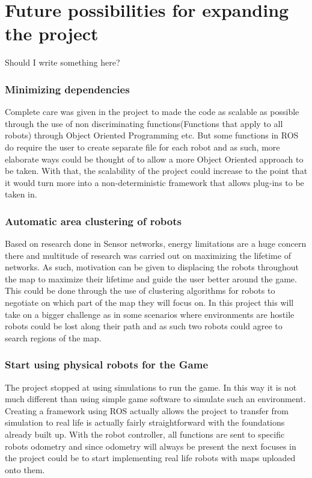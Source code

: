 \documentclass{report}
\begin{document}
    \section{Future possibilities for expanding the project}
      Should I write something here?

      \subsubsection{Minimizing dependencies}
        Complete care was given in the project to made the code as scalable as possible through the use of non discriminating functions(Functions that apply to all robots) through Object Oriented Programming etc. But some functions in ROS do require the user to create separate file for each robot and as such, more elaborate ways could be thought of to allow a more Object Oriented approach to be taken. With that, the scalability of the project could increase to the point that it would turn more into a non-deterministic framework that allows plug-ins to be taken in.

      \subsubsection{Automatic area clustering of robots}
        Based on research done in Sensor networks, energy limitations are a huge concern there and multitude of research was carried out on maximizing the lifetime of networks. As such, motivation can be given to displacing the robots throughout the map to maximize their lifetime and guide the user better around the game. This could be done through the use of clustering algorithms for robots to negotiate on which part of the map they will focus on. In this project this will take on a bigger challenge as in some scenarios where environments are hostile robots could be lost along their path and as such two robots could agree to search regions of the map.

      \subsubsection{Start using physical robots for the Game}
        The project stopped at using simulations to run the game. In this way it is not much different than using simple game software to simulate such an environment. Creating a framework using ROS actually allows the project to transfer from simulation to real life is actually fairly straightforward with the foundations already built up. With the robot controller, all functions are sent to specific robots odometry and since odometry will always be present the next focuses in the project could be to start implementing real life robots with maps uploaded onto them.
\end{document}
